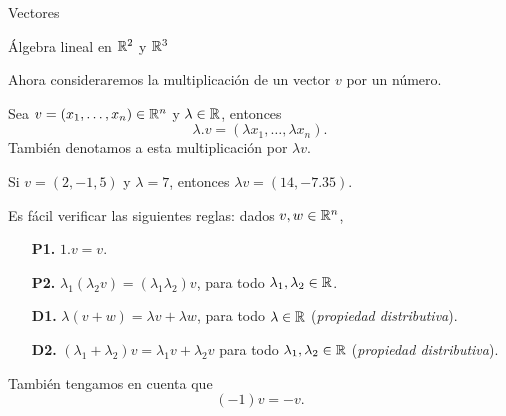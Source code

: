 \begin{chapter}{Vectores}
\begin{section}{\'Algebra lineal en $\mathbb R^2$ y $\mathbb R^3$}
    

    Ahora consideraremos la multiplicación de un vector $v$ por un número. 
    
    \begin{definicion}
        Sea $v = (x_1,\ldots,x_n) \in \mathbb R^n$ y $\lambda \in \mathbb R$, entonces
        \begin{equation*}
            \lambda.v = (\lambda x_1,\ldots,\lambda x_n).
        \end{equation*}  
        También denotamos a esta multiplicación por $\lambda v$.
    \end{definicion}

    \begin{ejemplo*}
         Si $v= (2, -1,5)$  y $\lambda = 7$, entonces $\lambda v = (14, -7.35)$.
    \end{ejemplo*}
    
    Es fácil verificar las siguientes reglas: dados $v,w \in \mathbb R^n$, 
    \begin{enumerate}
        \item[\textbf{P1.}] $1.v=v$.
        \item[\textbf{P2.}] $\lambda_1(\lambda_2v) = (\lambda_1\lambda_2)v$, para todo $\lambda_1,\lambda_2 \in \mathbb R$.
        \item[\textbf{D1.}] $\lambda(v+w) = \lambda v +\lambda w$, para todo $\lambda \in \mathbb R$  (\textit{propiedad distributiva}).
        \item[\textbf{D2.}] $(\lambda_1+\lambda_2)v = \lambda_1v + \lambda_2 v$ para todo $\lambda_1,\lambda_2 \in \mathbb R$  (\textit{propiedad distributiva}).
    \end{enumerate}

    También tengamos en cuenta que 
    \begin{equation*}
        (-1)v = -v.
    \end{equation*}
    

\end{section}
\end{chapter}

